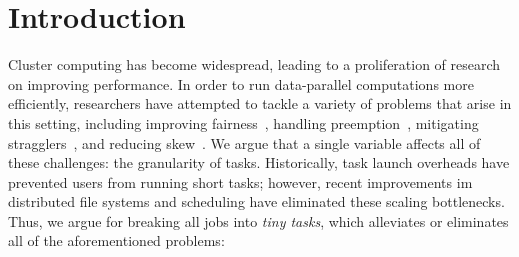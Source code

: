 \section{Introduction}
Cluster computing has become widespread, leading to a proliferation of
research on improving performance.  In order to run data-parallel
computations more efficiently, researchers have attempted
to tackle a variety of problems that arise in this setting,
including improving
fairness~\cite{zaharia2008improving,hindman2011mesos},
handling preemption~\cite{ananthanarayanan2012true,isard2009quincy},
mitigating stragglers~\cite{ananthanarayanan2010reining,ananthanarayanan2012why},
and reducing skew~\cite{ananthanarayanan2011scarlett,kwon2012skewtune,gufler2012load}.
We argue that a single variable affects all of these challenges: the
granularity of tasks.
Historically, task launch overheads have prevented users from running
short tasks; however, recent improvements im distributed file systems and
scheduling have eliminated these scaling bottlenecks.
Thus, we argue for
breaking all jobs into \emph{tiny tasks}, which alleviates or eliminates
all of the aforementioned problems:


